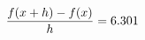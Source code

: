 \documentclass[preview]{standalone}
\begin{document}
\begin{align*}
\special{dvisvgm:raw <g id='unique000'>}\frac{f(x+h)-f(x)}{h} = 6.301\special{dvisvgm:raw </g>}
\end{align*}
\end{document}
